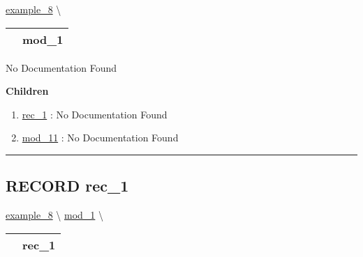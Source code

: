 \hypertarget{ecldoc:intest.example_8.mod_1}{}
\hspace{0pt} \hyperlink{ecldoc:intest.example_8}{example_8} \textbackslash 

{\renewcommand{\arraystretch}{1.5}
\begin{tabularx}{\textwidth}{|>{\raggedright\arraybackslash}l|X|}
\hline
\hspace{0pt}\mytexttt{\color{red} } & \textbf{mod\_1} \\
\hline
\end{tabularx}
}

\par





No Documentation Found







\textbf{Children}
\begin{enumerate}
\item \hyperlink{ecldoc:intest.example_8.mod_1.rec_1}{rec\_1}
: No Documentation Found
\item \hyperlink{ecldoc:intest.example_8.mod_1.mod_11}{mod\_11}
: No Documentation Found
\end{enumerate}

\rule{\linewidth}{0.5pt}

\subsection*{\textsf{\colorbox{headtoc}{\color{white} RECORD}
rec\_1}}

\hypertarget{ecldoc:intest.example_8.mod_1.rec_1}{}
\hspace{0pt} \hyperlink{ecldoc:intest.example_8}{example_8} \textbackslash 
\hspace{0pt} \hyperlink{ecldoc:intest.example_8.mod_1}{mod_1} \textbackslash 

{\renewcommand{\arraystretch}{1.5}
\begin{tabularx}{\textwidth}{|>{\raggedright\arraybackslash}l|X|}
\hline
\hspace{0pt}\mytexttt{\color{red} } & \textbf{rec\_1} \\
\hline
\end{tabularx}
}

\par





